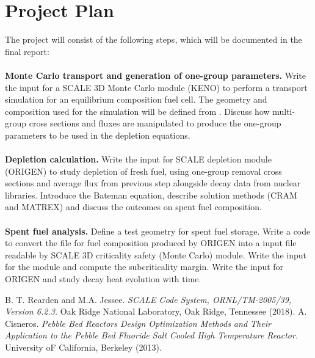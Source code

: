 \documentclass[a4paper]{article}
\begin{document}
\section{Project Plan}
The project will consist of the following steps, which will be documented in the final report:\\
\\\textbf{Monte Carlo transport and generation of one-group parameters.}
Write the input for a SCALE 3D Monte Carlo module (KENO) to perform a transport simulation for an equilibrium composition fuel cell.  The geometry and composition used for the simulation will be defined from \cite{Cisneros}. Discuss how multi-group cross sections and fluxes are manipulated to produce the one-group parameters to be used in the depletion equations.\\
\\\textbf{Depletion calculation.}
Write the input for SCALE depletion module (ORIGEN) to study depletion of fresh fuel, using one-group removal cross sections and average flux from previous step alongside decay data from nuclear libraries. Introduce the Bateman equation, describe solution methods (CRAM and MATREX) and discuss the outcomes on spent fuel composition.\\
\\\textbf{Spent fuel analysis.}
Define a test geometry for spent fuel storage. Write a code to convert the file for fuel composition produced by ORIGEN into a input file readable by SCALE 3D criticality safety (Monte Carlo) module. Write the input for the module and compute the subcriticality margin. Write the input for ORIGEN and study decay heat evolution with time.
\begin{thebibliography}{}
B. T. Rearden and M.A. Jessee.
\textit{SCALE Code System, ORNL/TM-2005/39, Version 6.2.3.} 
{Oak Ridge National Laboratory, Oak Ridge, Tennessee (2018).}
A. Cisneros.
\textit{Pebble Bed Reactors Design Optimization Methods and Their Application to the Pebble Bed Fluoride Salt Cooled High Temperature Reactor.}
{University oF California, Berkeley (2013).}
\end{thebibliography}
\end{document}
